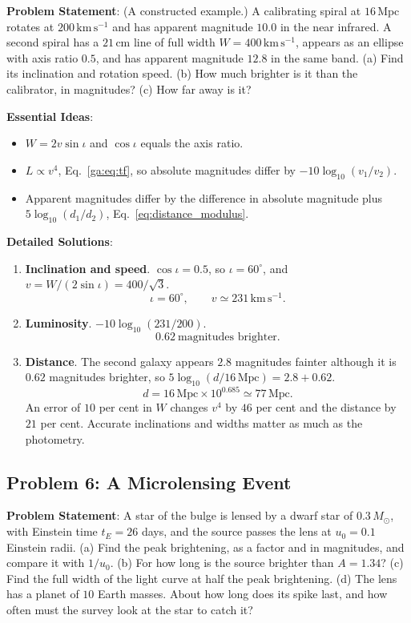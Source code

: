 \textbf{Problem Statement}: (A constructed example.) A calibrating spiral at $16\,\mathrm{Mpc}$ rotates at $200\,\mathrm{km\,s^{-1}}$ and has apparent magnitude $10.0$ in the near infrared. A second spiral has a $21\,\mathrm{cm}$ line of full width $W=400\,\mathrm{km\,s^{-1}}$, appears as an ellipse with axis ratio $0.5$, and has apparent magnitude $12.8$ in the same band. (a) Find its inclination and rotation speed. (b) How much brighter is it than the calibrator, in magnitudes? (c) How far away is it?

\textbf{Essential Ideas}:
\begin{itemize}
	\item $W=2v\sin\iota$ and $\cos\iota$ equals the axis ratio.
	\item $L\propto v^4$, Eq.~\eqref{ga:eq:tf}, so absolute magnitudes differ by $-10\log_{10}(v_1/v_2)$.
	\item Apparent magnitudes differ by the difference in absolute magnitude plus $5\log_{10}(d_1/d_2)$, Eq.~\eqref{eq:distance_modulus}.
\end{itemize}

\textbf{Detailed Solutions}:
\begin{enumerate}[label=(\alph*)]
	\item \textbf{Inclination and speed}. $\cos\iota=0.5$, so $\iota=60^\circ$, and $v=W/(2\sin\iota)=400/\sqrt3$.
	\[
	\boxed{\iota=60^\circ,\qquad v\simeq231\,\mathrm{km\,s^{-1}}.}
	\]
	\item \textbf{Luminosity}. $-10\log_{10}(231/200)$.
	\[
	\boxed{0.62\ \text{magnitudes brighter}.}
	\]
	\item \textbf{Distance}. The second galaxy appears $2.8$ magnitudes fainter although it is $0.62$ magnitudes brighter, so $5\log_{10}(d/16\,\mathrm{Mpc})=2.8+0.62$.
	\[
	\boxed{d=16\,\mathrm{Mpc}\times10^{0.685}\simeq77\,\mathrm{Mpc}.}
	\]
	An error of $10$ per cent in $W$ changes $v^4$ by $46$ per cent and the distance by $21$ per cent. Accurate inclinations and widths matter as much as the photometry.
\end{enumerate}

\subsection{Problem 6: A Microlensing Event}
\label{ga:prob:microlens}

\textbf{Problem Statement}: A star of the bulge is lensed by a dwarf star of $0.3\,M_\odot$, with Einstein time $t_E=26$ days, and the source passes the lens at $u_0=0.1$ Einstein radii. (a) Find the peak brightening, as a factor and in magnitudes, and compare it with $1/u_0$. (b) For how long is the source brighter than $A=1.34$? (c) Find the full width of the light curve at half the peak brightening. (d) The lens has a planet of $10$ Earth masses. About how long does its spike last, and how often must the survey look at the star to catch it?

